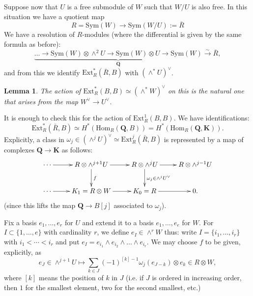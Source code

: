 \documentclass[10pt]{amsart}
\newcommand{\Ext}{\mathrm{Ext}}
\newcommand{\Hom}{\mathrm{Hom}}
\newcommand{\Sym}{\mathrm{Sym}}
\newtheorem{lemma}[subsection]{Lemma}
\theoremstyle{remark}
\begin{document}
%
%
%
%
%
%
%
%


   
  Suppose now that $U$ is a free submodule of $W$ such that $W/U$ is also free.  In this situation we have a quotient map $$R = \Sym(W) \rightarrow \Sym(W/U) := \bar{R}$$ 
  We have a resolution of $R$-modules  (where the differential is given by the same formula as before): 
      $$\underbrace{ \dots \rightarrow \Sym(W)  \otimes \wedge^2 U \rightarrow  \Sym(W) \otimes U \rightarrow  \Sym(W)}_{\mathbf{Q}} \stackrel{\sim}{\longrightarrow} \bar{R},$$
and from this we  identify $\Ext_R^*(\bar{R}, B)$ with $(\wedge^* U)^{\vee}$. 

\begin{lemma}
The action of $\Ext^*_R(B, B) \simeq (\wedge^* W)^{\vee}$ on this is the natural one that arises from the map $W^{\vee} \rightarrow U^{\vee}$. 
\end{lemma}

\proof 
   It is enough to check this for the action of $\Ext^1_R(B, B)$.   
 We have identifications:
   $$ \Ext^*_R(\bar{R}, B) \simeq H^*\left(  \Hom_{R}(\mathbf{Q}, B) \right)  =  H^* \left( \Hom_R(\mathbf{Q}, \mathbf{K}) \right). $$
Explicitly, a class in $ \omega_j \in (\wedge^j U)^{\vee} \simeq \Ext^j_R(\bar{R}, B)$  
is represented by a map of complexes $\mathbf{Q} \rightarrow \mathbf{K}$ as follows:    
 \begin{equation}
 \xymatrix{
\cdots \ar[r]   &  	 R \otimes \wedge^{j+1}U \ar[r] \ar[d]^f 	&   R \otimes  \wedge^j U  \ar[r] \ar[d]^{\omega_j \in \wedge^j U^{\vee}} 	&   R \otimes  \wedge^{j-1} U   \\
\cdots  \ar[r]   &		 K_1=R \otimes W \ar[r] 				& K_0=R				\ar[r] 									& 0. 
 }
\end{equation}
(since this lifts 
  the map  $\mathbf{Q} \rightarrow B[j]$ associated to  $\omega_j$).
  
Fix a basis $e_1, \dots, e_r$ for $U$ and extend it to a basis $e_1, \dots, e_{e}$ for $W$.
For $I \subset \{1, \dots, e\}$ with cardinality $r$, we define $e_I \in \wedge^r W$ thus: 
write  $I = \{i_1, \dots, i_r\}$ with $i_1 < \cdots < i_r$
and put $e_I  = e_{i_1} \wedge e_{i_2} \wedge \dots \wedge e_{i_r}$. 
  We may choose $f$ to be given, explicitly, as  
$$ e_J \in \wedge^{j+1} U \mapsto \sum_{k \in J}  (-1)^{[k]-1} \omega_j(e_{J-k})   \otimes e_k \in R \otimes W,$$ 
where $[k]$ means the position of $k$ in $J$ (i.e.  if $J$ is ordered in increasing order, then $1$ for the smallest element, two for the second smallest, etc.)
\end{document}
